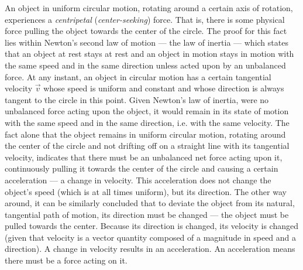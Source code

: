 
An object in uniform circular motion, rotating around a certain axis of rotation, experiences a \emph{centripetal} (\emph{center-seeking}) force. That is, there is some physical force pulling the object towards the center of the circle. The proof for this fact lies within Newton's second law of motion --- the law of inertia --- which states that an object at rest stays at rest and an object in motion stays in motion with the same speed and in the same direction unless acted upon by an unbalanced force. At any instant, an object in circular motion has a certain tangential velocity $\vec{v}$ whose speed is uniform and constant and whose direction is always tangent to the circle in this point. Given Newton's law of inertia, were no unbalanced force acting upon the object, it would remain in its state of motion with the same speed and in the same direction, i.e. with the same velocity. The fact alone that the object remains in uniform circular motion, rotating around the center of the circle and not drifting off on a straight line with its tangential velocity, indicates that there must be an unbalanced net force acting upon it, continuously pulling it towards the center of the circle and causing a certain acceleration --- a change in velocity. This acceleration does not change the object's speed (which is at all times uniform), but its direction. The other way around, it can be similarly concluded that to deviate the object from its natural, tangential path of motion, its direction must be changed --- the object must be pulled towards the center. Because its direction is changed, its velocity is changed (given that velocity is a vector quantity composed of a magnitude in speed and a direction). A change in velocity results in an acceleration. An acceleration means there must be a force acting on it.

